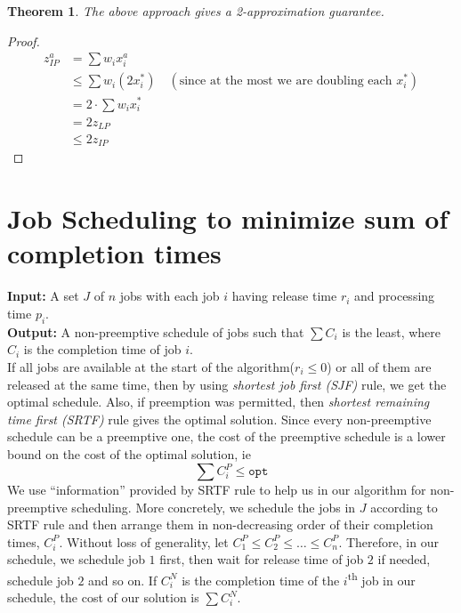 \documentclass[10pt]{article}
\newtheorem{theorem}{Theorem}[section]
\numberwithin{equation}{section}
\begin{document}
\begin{theorem}
The above approach gives a 2-approximation guarantee.
\end{theorem}
\begin{proof}
\begin{align*}
z_{IP}^a & = \sum w_i x_i^a \\
        & \leq \sum w_i (2x_i^*) \quad (\text{since at the most we are doubling each $x_i^*$})\\
        & = 2 \cdot \sum w_i x_i^* \\
        & = 2 z_{LP} \\
        & \leq 2 z_{IP} 
\end{align*}
\end{proof}

\section{Job Scheduling to minimize sum of completion times}
\textbf{Input: } A set $J$ of $n$ jobs with each job $i$ having release time $r_i$ and processing time $p_i$. \\
\textbf{Output: } A non-preemptive schedule of jobs such that $\sum C_i$ is the least, where $C_i$ is the completion time of job $i$. \\

If all jobs are available at the start of the algorithm($r_i \leq 0$) or all of them are released at the same time, then by using \emph{shortest job first (SJF)} rule, we get the optimal schedule. Also, if preemption was permitted, then \emph{shortest remaining time first (SRTF)} rule gives the optimal solution. Since every non-preemptive schedule can be a preemptive one, the cost of the preemptive schedule is a lower bound on the cost of the optimal solution, ie
\[
\sum C_i^P \leq \texttt{opt}
\]
We use ``information'' provided by SRTF rule to help us in our algorithm for non-preemptive scheduling. More concretely, we schedule the jobs in $J$ according to SRTF rule and then arrange them in non-decreasing order of their completion times, $C_i^P$. Without loss of generality, let $C_1^P \leq C_2^P \leq \ldots \leq C_n^P$. Therefore, in our schedule, we schedule job $1$ first, then wait for release time of job $2$ if needed, schedule job $2$ and so on. If $C_i^N$ is the completion time of the $i$\textsuperscript{th} job in our schedule, the cost of our solution is $\sum C_i^N$.
\end{document}
